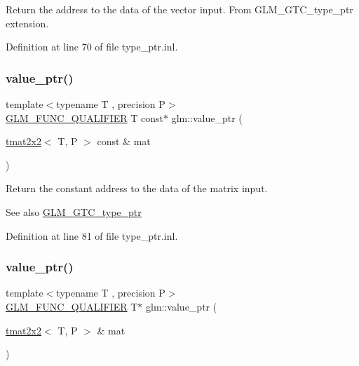 Return the address to the data of the vector input. From G\+L\+M\+\_\+\+G\+T\+C\+\_\+type\+\_\+ptr extension. 

Definition at line 70 of file type\+\_\+ptr.\+inl.

\mbox{\label{group__gtc__type__ptr_ga2d709523aa0beb0a42433f80c9d07718}} 
\subsubsection{\texorpdfstring{value\_ptr()}{value\_ptr()}\hspace{0.1cm}{\footnotesize\ttfamily [8/27]}}
{\footnotesize\ttfamily template$<$typename T , precision P$>$ \\
\mbox{\hyperlink{setup_8hpp_a33fdea6f91c5f834105f7415e2a64407}{G\+L\+M\+\_\+\+F\+U\+N\+C\+\_\+\+Q\+U\+A\+L\+I\+F\+I\+ER}} T const$\ast$ glm\+::value\+\_\+ptr (\begin{DoxyParamCaption}\item[{\mbox{\hyperlink{structglm_1_1tmat2x2}{tmat2x2}}$<$ T, P $>$ const \&}]{mat }\end{DoxyParamCaption})}

Return the constant address to the data of the matrix input. \begin{DoxySeeAlso}{See also}
\mbox{\hyperlink{group__gtc__type__ptr}{G\+L\+M\+\_\+\+G\+T\+C\+\_\+type\+\_\+ptr}} 
\end{DoxySeeAlso}


Definition at line 81 of file type\+\_\+ptr.\+inl.

\mbox{\label{group__gtc__type__ptr_gac7256e14328e818e61276fa5e6176b9d}} 
\subsubsection{\texorpdfstring{value\_ptr()}{value\_ptr()}\hspace{0.1cm}{\footnotesize\ttfamily [9/27]}}
{\footnotesize\ttfamily template$<$typename T , precision P$>$ \\
\mbox{\hyperlink{setup_8hpp_a33fdea6f91c5f834105f7415e2a64407}{G\+L\+M\+\_\+\+F\+U\+N\+C\+\_\+\+Q\+U\+A\+L\+I\+F\+I\+ER}} T$\ast$ glm\+::value\+\_\+ptr (\begin{DoxyParamCaption}\item[{\mbox{\hyperlink{structglm_1_1tmat2x2}{tmat2x2}}$<$ T, P $>$ \&}]{mat }\end{DoxyParamCaption})}

